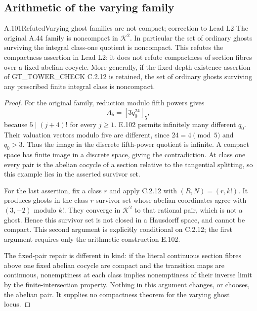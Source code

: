 \subsection{Arithmetic of the varying family}

\begin{result}{A.101}{Refuted}{Varying ghost families are not compact; correction to Lead L2}
The original A.44 family is noncompact in $\mathcal K^2$. In particular
the set of ordinary ghosts surviving the integral class-one quotient
is noncompact. This refutes the compactness assertion in Lead L2;
it does not refute compactness of section fibres over a fixed abelian
cocycle. More generally, if the fixed-depth existence assertion of
GT\_TOWER\_CHECK C.2.12 is retained, the set of ordinary ghosts
surviving any prescribed finite integral class is noncompact.
\end{result}
\begin{proof}
For the original family, reduction modulo fifth powers gives
\[
A_5=[3q_0^{24}]_5,
\]
because $5\mid(j+4)!$ for every $j\ge1$. E.102 permits infinitely
many different $q_0$. Their valuation vectors modulo five are
different, since $24=4\pmod5$ and $q_0>3$. Thus the image in the
discrete fifth-power quotient is infinite. A compact space has finite
image in a discrete space, giving the contradiction. At class one
every pair is the abelian cocycle of a section relative to the
tangential splitting, so this example lies in the asserted survivor
set.

For the last assertion, fix a class $r$ and apply C.2.12 with
$(R,N)=(r,k!)$. It produces ghosts in the class-$r$ survivor set whose
abelian coordinates agree with $(3,-2)$ modulo $k!$. They converge in
$\mathcal K^2$ to that rational pair, which is not a ghost. Hence this
survivor set is not closed in a Hausdorff space, and cannot be compact.
This second argument is explicitly conditional on C.2.12; the first
argument requires only the arithmetic construction E.102.

The fixed-pair repair is different in kind: if the literal continuous
section fibres above one fixed abelian cocycle are compact and the
transition maps are continuous, nonemptiness at each class implies
nonemptiness of their inverse limit by the finite-intersection
property. Nothing in this argument changes, or chooses, the abelian
pair. It supplies no compactness theorem for the varying ghost locus.
\end{proof}
